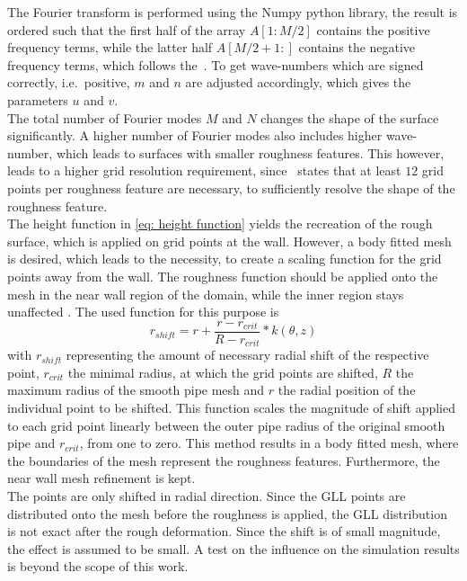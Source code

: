 The Fourier transform is performed using the Numpy python library, the result is ordered such that the first half of the array $A[1:M/2]$ contains the positive frequency terms, while the latter half $A[M/2+1:]$ contains the negative frequency terms, which follows the~\cite{NumpyFT}.
To get wave-numbers which are signed correctly, i.e.\ positive, $m$ and $n$ are adjusted accordingly, which gives the parameters $u$ and $v$.\\
The total number of Fourier modes $M$ and $N$ changes the shape of the surface significantly.
A higher number of Fourier modes also includes higher wave-number, which leads to surfaces with smaller roughness features. 
This however, leads to a higher grid resolution requirement, since~\cite{chungPredictingDragRough2021} states that at least $12$ grid points per roughness feature are necessary, to sufficiently resolve the shape of the roughness feature.\\
The height function in \autoref{eq: height function} yields the recreation of the rough surface, which is applied on grid points at the wall.
However, a body fitted mesh is desired, which leads to the necessity, to create a scaling function for the grid points away from the wall.
The roughness function should be applied onto the mesh in the near wall region of the domain, while the inner region stays unaffected \citep{chanSystematicInvestigationRoughness2015}.
The used function for this purpose is
\begin{equation}\label{eq: roughness scaling function}
    r_{shift} = r + \frac{r - r_{crit}}{R - r_{crit}} * k(\theta,z) 
\end{equation}
with $r_{shift}$ representing the amount of necessary radial shift of the respective point, $r_{crit}$ the minimal radius, at which the grid points are shifted, $R$ the maximum radius of the smooth pipe mesh and $r$ the radial position of the individual point to be shifted.
This function scales the magnitude of shift applied to each grid point linearly between the outer pipe radius of the original smooth pipe and $r_{crit}$, from one to zero.
This method results in a body fitted mesh, where the boundaries of the mesh represent the roughness features.
Furthermore, the near wall mesh refinement is kept.\\
The points are only shifted in radial direction.
Since the GLL points are distributed onto the mesh before the roughness is applied, the GLL distribution is not exact after the rough deformation.
Since the shift is of small magnitude, the effect is assumed to be small.
A test on the influence on the simulation results is beyond the scope of this work. 

